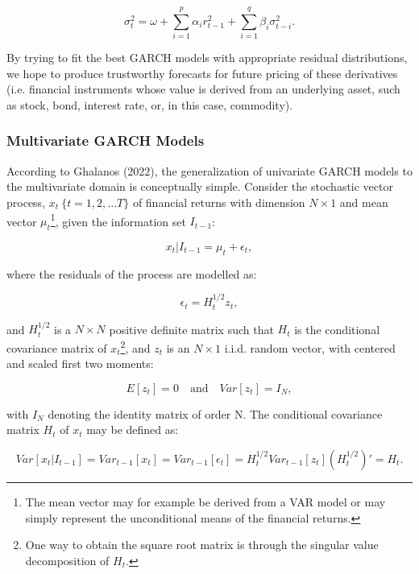 \documentclass[11pt]{article}
\begin{document}
\begin{equation}
\sigma_{t}^{2} = \omega + \sum_{i=1}^{p}\alpha_{i}r_{t-1}^{2} + \sum_{i=1}^{q}\beta_{i}\sigma_{t-i}^{2}.
\end{equation}

By trying to fit the best GARCH models with appropriate residual distributions, we hope to produce trustworthy forecasts for future pricing of these derivatives (i.e. financial instruments whose value is derived from an underlying asset, such as stock, bond, interest rate, or, in this case, commodity).

\subsubsection{Multivariate GARCH Models}

According to Ghalanos (2022), the generalization of univariate GARCH models to the multivariate domain is conceptually simple. Consider the stochastic vector process, $x_{t}\ \{t = 1, 2, ...T\}$ of financial returns with dimension $N \times 1$ and mean vector $\mu_{t}$\footnote{The mean vector may for example be derived from a VAR model or may simply represent the unconditional means of the financial returns.}, given the information set $I_{t-1}$:

\begin{equation}
x_{t}|I_{t-1} = \mu_{t} + \epsilon_{t},
\end{equation}

where the residuals of the process are modelled as:

\begin{equation}
\epsilon_{t} = H_{t}^{1/2}z_{t},
\end{equation}

and $H_{t}^{1/2}$ is a $N \times N$ positive definite matrix such that $H_{t}$ is the conditional covariance matrix of $x_{t}$\footnote{One way to obtain the square root matrix is through the singular value decomposition of $H_t$.}, and $z_{t}$ is an $N \times 1$ i.i.d. random vector, with centered and scaled first two moments:

\begin{equation}
E[z_{t}] = 0 \quad \text{and} \quad Var[z_{t}] = I_{N},
\end{equation}

with $I_{N}$ denoting the identity matrix of order N. The conditional covariance matrix $H_{t}$ of $x_{t}$ may be defined as:

\begin{equation}
Var[x_{t}|I_{t-1}] = Var_{t-1}[x_{t}] = Var_{t-1}[\epsilon_{t}] = H_{t}^{1/2}Var_{t-1}[z_{t}](H_{t}^{1/2})' = H_{t}.
\end{equation}
\end{document}
